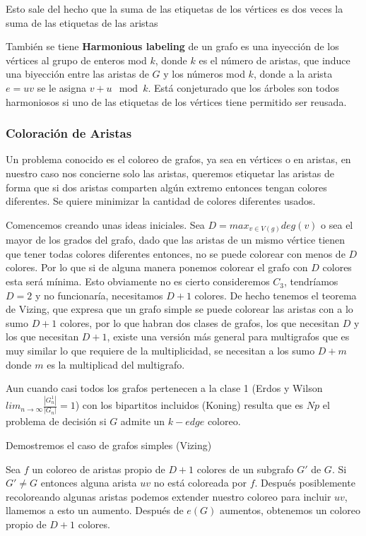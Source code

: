 \documentclass[a4paper]{article}
\begin{document}
Esto sale del hecho que la suma de las etiquetas de los v\'ertices es dos veces la suma de las etiquetas de las aristas 

Tambi\'en se tiene \textbf{Harmonious labeling} de un grafo es una inyecci\'on de los v\'ertices al grupo de enteros mod  $k$, donde $k$ es el n\'umero de aristas, que induce una biyecci\'on entre las aristas de $G$ y los n\'umeros mod $k$, donde a la arista $e=uv$ se le asigna $v+u \mod k$. Est\'a conjeturado que los \'arboles son todos harmoniosos si uno de las etiquetas de los v\'ertices tiene permitido ser reusada.

\subsubsection{Coloraci\'on de Aristas}
 Un problema conocido es el coloreo de grafos, ya sea en v\'ertices o en aristas, en nuestro caso nos concierne solo las aristas, queremos etiquetar las aristas de forma que si dos aristas comparten alg\'un extremo entonces tengan colores diferentes. Se quiere minimizar la cantidad de colores diferentes usados.


 Comencemos creando unas ideas iniciales. Sea $D = max_{v \in V(g)}deg(v)$ o sea el mayor de los grados del grafo, dado que las aristas de un mismo v\'ertice tienen que tener todas colores diferentes entonces, no se puede colorear con menos de $D$ colores. Por lo que si de alguna manera ponemos colorear el grafo con $D$ colores esta ser\'a m\'inima. Esto obviamente no es cierto consideremos $C_3$, tendr\'iamos $D = 2$ y no funcionar\'ia, necesitamos $D+1$ colores. De hecho tenemos el teorema de Vizing, que expresa que un grafo simple se puede colorear las aristas con a lo sumo $D + 1$ colores, por lo que habran dos clases de grafos, los que necesitan $D$ y los que necesitan $D+1$, existe una versi\'on m\'as general para multigrafos que es muy similar lo que requiere de la multiplicidad, se necesitan a los sumo $D + m$ donde $m$ es la multiplicad del multigrafo.

 Aun cuando casi todos los grafos pertenecen a la clase 1 (Erdos y Wilson $lim_{n \rightarrow  \infty} \frac{|G_n^1|}{|G_n|} = 1$) con los bipartitos incluidos (Koning) resulta que es $Np$ el problema de decisi\'on si $G$ admite un $k-edge$ coloreo.

 Demostremos el caso de grafos simples (Vizing)

 Sea $f$ un coloreo de aristas propio de $D + 1$ colores de un subgrafo $G'$ de $G$. Si $G' \neq G $ entonces alguna arista $uv$ no est\'a coloreada por $f$. Despu\'es posiblemente recoloreando algunas aristas podemos extender nuestro coloreo para incluir $uv$, llamemos a esto un aumento. Despu\'es de $e(G)$ aumentos, obtenemos un coloreo propio de $D + 1$ colores. 
 
\end{document}
